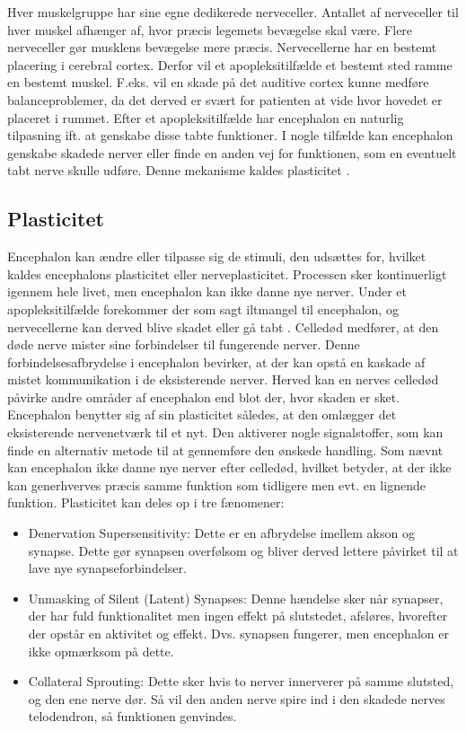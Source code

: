 Hver muskelgruppe har sine egne dedikerede nerveceller. Antallet af nerveceller til hver muskel afhænger af, hvor præcis legemets bevægelse skal være. Flere nerveceller gør musklens bevægelse mere præcis. \cite{Stanfield2014} Nervecellerne har en bestemt placering i cerebral cortex. Derfor vil et apopleksitilfælde et bestemt sted ramme en bestemt muskel. F.eks. vil en skade på det auditive cortex kunne medføre balanceproblemer, da det derved er svært for patienten at vide hvor hovedet er placeret i rummet. \cite{Mao2014} Efter et apopleksitilfælde har encephalon en naturlig tilpasning ift. at genskabe disse tabte funktioner. I nogle tilfælde kan encephalon genskabe skadede nerver eller finde en anden vej for funktionen, som en eventuelt tabt nerve skulle udføre. \cite{Martini2012} Denne mekanisme kaldes plasticitet \cite{Ramanathan2006}. 

\subsection{Plasticitet}
Encephalon kan ændre eller tilpasse sig de stimuli, den udsættes for, hvilket kaldes encephalons plasticitet eller nerveplasticitet. Processen sker kontinuerligt igennem hele livet, men encephalon kan ikke danne nye nerver. \cite{Stanfield2014} Under et apopleksitilfælde forekommer der som sagt iltmangel til encephalon, og nervecellerne kan derved blive skadet eller gå tabt \cite{Schulze2011}. Celledød medfører, at den døde nerve mister sine forbindelser til fungerende nerver. Denne forbindelsesafbrydelse i encephalon bevirker, at der kan opstå en kaskade af mistet kommunikation i de eksisterende nerver. Herved kan en nerves celledød påvirke andre områder af encephalon end blot der, hvor skaden er sket. \cite{Raine2009} Encephalon benytter sig af sin plasticitet således, at den omlægger det eksisterende nervenetværk til et nyt. Den aktiverer nogle signalstoffer, som kan finde en alternativ metode til at gennemføre den ønskede handling. \cite{Rugnett2015}  Som nævnt kan encephalon ikke danne nye nerver efter celledød, hvilket betyder, at der ikke kan generhverves præcis samme funktion som tidligere men evt. en lignende funktion. %
Plasticitet kan deles op i tre fænomener: \cite{Raine2009}

\begin{itemize}
	\item Denervation Supersensitivity: Dette er en afbrydelse imellem akson og synapse. Dette gør synapsen overfølsom og bliver derved lettere påvirket til at lave nye synapseforbindelser.
	\item Unmasking of Silent (Latent) Synapses: Denne hændelse sker når synapser, der har fuld funktionalitet men ingen effekt på slutstedet, afsløres, hvorefter der opstår en aktivitet og effekt. Dvs. synapsen fungerer, men encephalon er ikke opmærksom på dette.
	\item Collateral Sprouting: Dette sker hvis to nerver innerverer på samme slutsted, og den ene nerve dør. Så vil den anden nerve spire ind i den skadede nerves telodendron, så funktionen genvindes.
\end{itemize}

